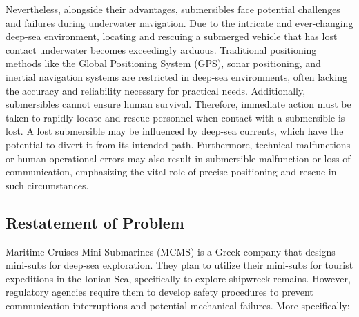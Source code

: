 \documentclass[12pt]{article}
\begin{document}
Nevertheless, alongside their advantages, submersibles face potential challenges and failures during underwater navigation. Due to the intricate and ever-changing deep-sea environment, locating and rescuing a submerged vehicle that has lost contact underwater becomes exceedingly arduous. Traditional positioning methods like the Global Positioning System (GPS), sonar positioning, and inertial navigation systems are restricted in deep-sea environments, often lacking the accuracy and reliability necessary for practical needs. Additionally, submersibles cannot ensure human survival. Therefore, immediate action must be taken to rapidly locate and rescue personnel when contact with a submersible is lost. A lost submersible may be influenced by deep-sea currents, which have the potential to divert it from its intended path. Furthermore, technical malfunctions or human operational errors may also result in submersible malfunction or loss of communication, emphasizing the vital role of precise positioning and rescue in such circumstances.

\subsection{Restatement of Problem}

Maritime Cruises Mini-Submarines (MCMS) is a Greek company that designs mini-subs for deep-sea exploration. They plan to utilize their mini-subs for tourist expeditions in the Ionian Sea, specifically to explore shipwreck remains. However, regulatory agencies require them to develop safety procedures to prevent communication interruptions and potential mechanical failures. More specifically:
\end{document}
